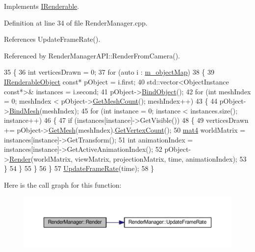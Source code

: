 Implements \hyperlink{class_i_renderable_aafd1a9b5729b8794fc5b7e8452ecc3c2}{I\+Renderable}.



Definition at line 34 of file Render\+Manager.\+cpp.



References Update\+Frame\+Rate().



Referenced by Render\+Manager\+A\+P\+I\+::\+Render\+From\+Camera().


\begin{DoxyCode}
35 \{
36   \textcolor{keywordtype}{int} verticesDrawn = 0;
37   \textcolor{keywordflow}{for} (\textcolor{keyword}{auto} i : \hyperlink{class_render_manager_a704122d9533952be089eb5bab7892740}{m\_objectMap})
38   \{
39     \hyperlink{class_i_renderable_object}{IRenderableObject} \textcolor{keyword}{const}* pObject = i.first;
40     std::vector<ObjectInstance const*>& instances = i.second;
41     pObject->\hyperlink{class_i_renderable_object_ab44c017819f2e57a9b4b4ba40961d9eb}{BindObject}();
42     \textcolor{keywordflow}{for} (\textcolor{keywordtype}{int} meshIndex = 0; meshIndex < pObject->\hyperlink{class_i_mesh_collection_adf67edfc7e63ed993082714cfc9de7e2}{GetMeshCount}(); meshIndex++)
43     \{
44       pObject->\hyperlink{class_i_renderable_object_ac0db472961e13dbbdc5cd36f14a87fae}{BindMesh}(meshIndex);
45       \textcolor{keywordflow}{for} (\textcolor{keywordtype}{int} instance = 0; instance < instances.size(); instance++)
46       \{
47         \textcolor{keywordflow}{if} (instances[instance]->GetVisible())
48         \{
49           verticesDrawn += pObject->\hyperlink{class_i_mesh_collection_a69a697dbe55af35db69dc056aef900a5}{GetMesh}(meshIndex).\hyperlink{class_i_mesh_aff814631d73a51d364824632beabe147}{GetVertexCount}();
50           \hyperlink{_types_8h_a2db59f395fe82a7394c6324956c265d8}{mat4} worldMatrix = instances[instance]->GetTransform();
51           \textcolor{keywordtype}{int} animationIndex = instances[instance]->GetActiveAnimationIndex();
52           pObject->\hyperlink{class_i_renderable_object_a6f47f692684ec70b5b776c0884495059}{Render}(worldMatrix, viewMatrix, projectionMatrix, time, animationIndex);
53         \}
54       \}
55     \}
56   \}
57   \hyperlink{class_render_manager_a85483a27c84d7e11ea6bf12bfd984f28}{UpdateFrameRate}(time);
58 \}
\end{DoxyCode}


Here is the call graph for this function\+:\nopagebreak
\begin{figure}[H]
\begin{center}
\leavevmode
\includegraphics[width=350pt]{class_render_manager_aa51d440b124cf2a1744655b1b24369f5_cgraph}
\end{center}
\end{figure}




